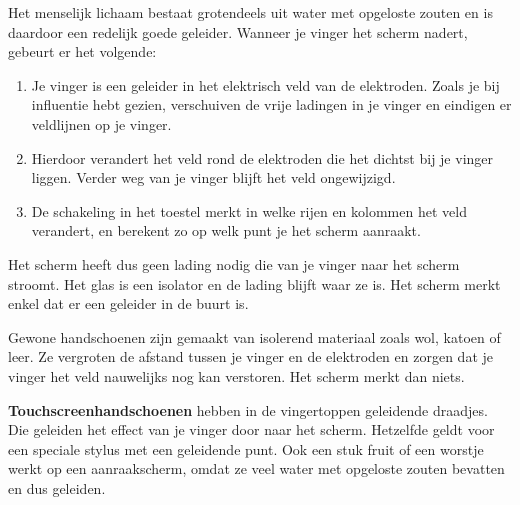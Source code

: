 \documentclass{ximera}
\begin{document}
Het menselijk lichaam bestaat grotendeels uit water met opgeloste zouten en is daardoor een redelijk goede geleider. Wanneer je vinger het scherm nadert, gebeurt er het volgende:
\begin{enumerate}
    \item Je vinger is een geleider in het elektrisch veld van de elektroden. Zoals je bij influentie hebt gezien, verschuiven de vrije ladingen in je vinger en eindigen er veldlijnen op je vinger.
    \item Hierdoor verandert het veld rond de elektroden die het dichtst bij je vinger liggen. Verder weg van je vinger blijft het veld ongewijzigd.
    \item De schakeling in het toestel merkt in welke rijen en kolommen het veld verandert, en berekent zo op welk punt je het scherm aanraakt.
\end{enumerate}

Het scherm heeft dus geen lading nodig die van je vinger naar het scherm stroomt. Het glas is een isolator en de lading blijft waar ze is. Het scherm merkt enkel dat er een geleider in de buurt is.

\begin{remark}[foldable=true,title={Waarom werkt een aanraakscherm niet met handschoenen?}]\nl
    Gewone handschoenen zijn gemaakt van isolerend materiaal zoals wol, katoen of leer. Ze vergroten de afstand tussen je vinger en de elektroden en zorgen dat je vinger het veld nauwelijks nog kan verstoren. Het scherm merkt dan niets.

    \textbf{Touchscreenhandschoenen} hebben in de vingertoppen geleidende draadjes. Die geleiden het effect van je vinger door naar het scherm. Hetzelfde geldt voor een speciale stylus met een geleidende punt. Ook een stuk fruit of een worstje werkt op een aanraakscherm, omdat ze veel water met opgeloste zouten bevatten en dus geleiden.
\end{remark}
\end{document}
